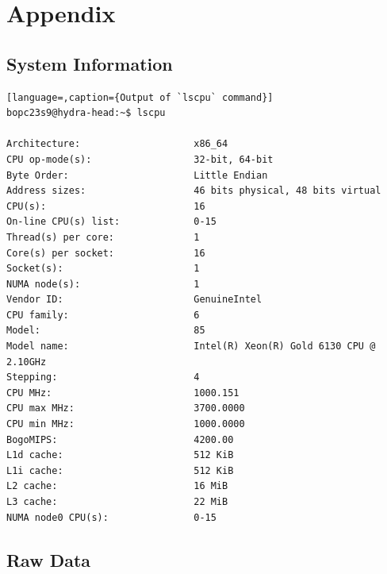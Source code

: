 \documentclass[a4paper,%
11pt,%
DIV12,
headsepline,%
headings=normal,
]{scrartcl}
\begin{document}
\newpage
\section*{Appendix}
\subsection*{System Information}

\begin{lstlisting}[language=,caption={Output of `lscpu` command}]
bopc23s9@hydra-head:~$ lscpu

Architecture:                    x86_64
CPU op-mode(s):                  32-bit, 64-bit
Byte Order:                      Little Endian
Address sizes:                   46 bits physical, 48 bits virtual
CPU(s):                          16
On-line CPU(s) list:             0-15
Thread(s) per core:              1
Core(s) per socket:              16
Socket(s):                       1
NUMA node(s):                    1
Vendor ID:                       GenuineIntel
CPU family:                      6
Model:                           85
Model name:                      Intel(R) Xeon(R) Gold 6130 CPU @ 2.10GHz
Stepping:                        4
CPU MHz:                         1000.151
CPU max MHz:                     3700.0000
CPU min MHz:                     1000.0000
BogoMIPS:                        4200.00
L1d cache:                       512 KiB
L1i cache:                       512 KiB
L2 cache:                        16 MiB
L3 cache:                        22 MiB
NUMA node0 CPU(s):               0-15
\end{lstlisting}

\subsection*{Raw Data}

\begin{table}[h]
\centering
{}
\caption{Output 2.2.1}
\label{tab:yourlabel}
\end{table}

\begin{table}[h]
\centering
{}
\caption{Output 2.2.2}
\label{tab:yourlabel}
\end{table}

\begin{table}[h]
\centering
{}
\caption{Output 2.3}
\label{tab:yourlabel}
\end{table}

\begin{table}[h]
\centering
{}
\caption{Output 2.4 Part 1}
\label{tab:yourlabel}
\end{table}

\begin{table}[h]
\centering
{}
\caption{Output 2.4 Part 2}
\label{tab:yourlabel}
\end{table}
\end{document}
